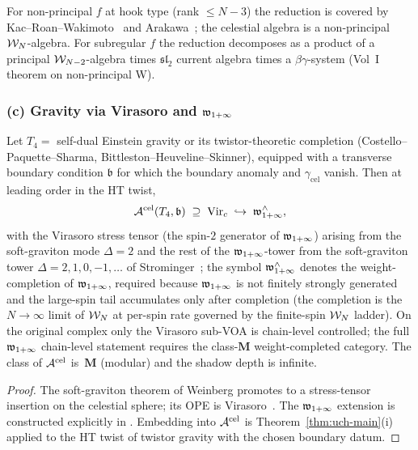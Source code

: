 \begin{remark}
\label{rem:uch-ds-hook}
For non-principal $f$ at hook type (rank $\leq N-3$) the reduction
is covered by Kac--Roan--Wakimoto~\cite{KRW03} and
Arakawa~\cite{Arakawa07}; the celestial algebra is a non-principal
$\mathcal W_N$-algebra. For subregular $f$ the reduction decomposes as a
product of a principal $\mathcal W_{N-2}$-algebra times $\mathfrak{sl}_2$
current algebra times a $\beta\gamma$-system (Vol~I theorem on
non-principal W).
\end{remark}

\subsubsection*{(c) Gravity via Virasoro and $\mathfrak w_{1+\infty}$}

\begin{proposition}
\label{prop:uch-gravity-leading}
Let $T_4 = $ self-dual Einstein gravity or its twistor-theoretic
completion (Costello--Paquette--Sharma, Bittleston--Heuveline--Skinner),
equipped with a transverse boundary condition $\mathfrak b$ for which
the boundary anomaly and $\gamma_{\mathrm{cel}}$ vanish. Then at
leading order in the HT twist,
\[
\mathcal A^{\mathrm{cel}}(T_4,\mathfrak b) \;\supseteq\; \mathrm{Vir}_c
\;\hookrightarrow\; \mathfrak w_{1+\infty}^{\wedge},
\]
with the Virasoro stress tensor (the spin-$2$ generator of $\mathfrak w_{1+\infty}$)
arising from the soft-graviton mode $\Delta = 2$ and the rest of the
$\mathfrak w_{1+\infty}$-tower from the soft-graviton tower
$\Delta = 2, 1, 0, -1, \dots$ of
Strominger~\cite{StromingerWInfinityCelestial}; the symbol
$\mathfrak w_{1+\infty}^{\wedge}$ denotes the weight-completion of $\mathfrak w_{1+\infty}$, required
because $\mathfrak w_{1+\infty}$ is not finitely strongly generated and the
large-spin tail accumulates only after completion
(the completion is the $N \to \infty$ limit of $\mathcal W_N$ at per-spin
rate governed by the finite-spin $\mathcal W_N$ ladder). On the original
complex only the Virasoro sub-VOA is chain-level controlled; the full
$\mathfrak w_{1+\infty}$ chain-level statement requires the class-$\mathbf M$ weight-completed
category. The class of $\mathcal A^{\mathrm{cel}}$ is~$\mathbf M$ (modular) and
the shadow depth is infinite.
\end{proposition}

\begin{proof}
The soft-graviton theorem of Weinberg promotes to a
stress-tensor insertion on the celestial sphere; its OPE is
Virasoro~\cite{DonnayFotopoulosPasterskiTaylor21}. The $\mathfrak w_{1+\infty}$
extension is constructed explicitly in
\cite{StromingerWInfinityCelestial,
DonnayFotopoulosPasterskiTaylor22,
AdamoMasonSharmaCelestial,
BittlestonHeuvelineSkinner}. Embedding into $\mathcal A^{\mathrm{cel}}$ is
Theorem~\ref{thm:uch-main}(i) applied to the HT twist of twistor
gravity with the chosen boundary datum.
\end{proof}


